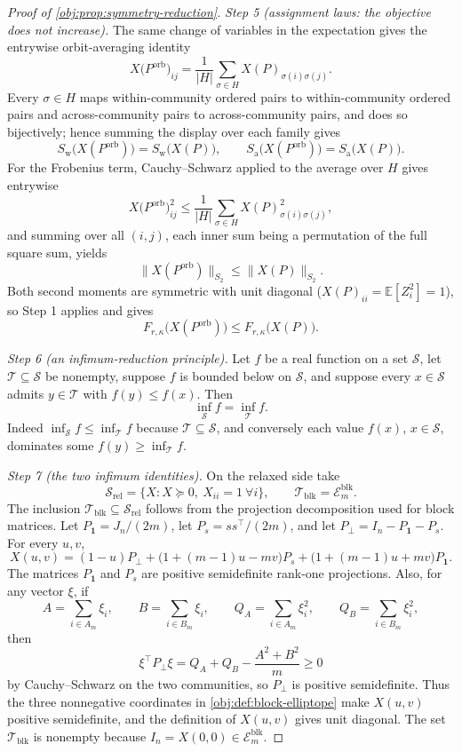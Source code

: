 \documentclass[11pt]{article}
\begin{document}
\begin{proof}[Proof of \cref{obj:prop:symmetry-reduction}]
\emph{Step 5 (assignment laws: the objective does not increase).}  The same change of variables in the expectation gives the entrywise orbit-averaging identity
\[
X\bigl(P^{\mathrm{orb}}\bigr)_{ij}
=\frac{1}{|H|}\sum_{\sigma\in H}X(P)_{\sigma(i)\sigma(j)} .
\]
Every \(\sigma\in H\) maps within-community ordered pairs to within-community ordered pairs and across-community pairs to across-community pairs, and does so bijectively; hence summing the display over each family gives
\[
S_{\mathrm{w}}\bigl(X(P^{\mathrm{orb}})\bigr)=S_{\mathrm{w}}\bigl(X(P)\bigr),
\qquad
S_{\mathrm{a}}\bigl(X(P^{\mathrm{orb}})\bigr)=S_{\mathrm{a}}\bigl(X(P)\bigr).
\]
For the Frobenius term, Cauchy--Schwarz applied to the average over \(H\) gives entrywise
\[
X\bigl(P^{\mathrm{orb}}\bigr)_{ij}^2
\le\frac{1}{|H|}\sum_{\sigma\in H}X(P)_{\sigma(i)\sigma(j)}^2 ,
\]
and summing over all \((i,j)\), each inner sum being a permutation of the full square sum, yields
\[
\bigl\|X(P^{\mathrm{orb}})\bigr\|_{S_2}\le\bigl\|X(P)\bigr\|_{S_2}.
\]
Both second moments are symmetric with unit diagonal (\(X(P)_{ii}=\mathbb E[Z_i^2]=1\)), so Step 1 applies and gives
\[
F_{r,\kappa}\bigl(X(P^{\mathrm{orb}})\bigr)\le F_{r,\kappa}\bigl(X(P)\bigr).
\]

\emph{Step 6 (an infimum-reduction principle).}  Let \(f\) be a real function on a set \(\mathcal S\), let \(\mathcal T\subseteq\mathcal S\) be nonempty, suppose \(f\) is bounded below on \(\mathcal S\), and suppose every \(x\in\mathcal S\) admits \(y\in\mathcal T\) with \(f(y)\le f(x)\).  Then
\[
\inf_{\mathcal S}f=\inf_{\mathcal T}f .
\]
Indeed \(\inf_{\mathcal S}f\le\inf_{\mathcal T}f\) because \(\mathcal T\subseteq\mathcal S\), and conversely each value \(f(x)\), \(x\in\mathcal S\), dominates some \(f(y)\ge\inf_{\mathcal T}f\). %

\emph{Step 7 (the two infimum identities).}  On the relaxed side take
\[
\mathcal S_{\mathrm{rel}}=\{X:X\succeq0,\ X_{ii}=1\ \forall i\},
\qquad
\mathcal T_{\mathrm{blk}}=\mathcal E_m^{\mathrm{blk}} .
\]
The inclusion \(\mathcal T_{\mathrm{blk}}\subseteq\mathcal S_{\mathrm{rel}}\) follows from the projection decomposition used for block matrices.  Let \(P_{\mathbf 1}=J_n/(2m)\), let \(P_s=ss^\top/(2m)\), and let \(P_\perp=I_n-P_{\mathbf 1}-P_s\).  For every \(u,v\),
\[
X(u,v)=(1-u)P_\perp
+\bigl(1+(m-1)u-mv\bigr)P_s
+\bigl(1+(m-1)u+mv\bigr)P_{\mathbf 1}.
\]
The matrices \(P_{\mathbf 1}\) and \(P_s\) are positive semidefinite rank-one projections.  Also, for any vector \(\xi\), if
\[
A=\sum_{i\in A_m}\xi_i,
\qquad
B=\sum_{i\in B_m}\xi_i,
\qquad
Q_A=\sum_{i\in A_m}\xi_i^2,
\qquad
Q_B=\sum_{i\in B_m}\xi_i^2,
\]
then
\[
\xi^\top P_\perp \xi
=Q_A+Q_B-\frac{A^2+B^2}{m}\ge0
\]
by Cauchy--Schwarz on the two communities, so \(P_\perp\) is positive semidefinite.  Thus the three nonnegative coordinates in \cref{obj:def:block-elliptope} make \(X(u,v)\) positive semidefinite, and the definition of \(X(u,v)\) gives unit diagonal. %
The set \(\mathcal T_{\mathrm{blk}}\) is nonempty because \(I_n=X(0,0)\in\mathcal E_m^{\mathrm{blk}}\).


\end{proof}
\end{document}

